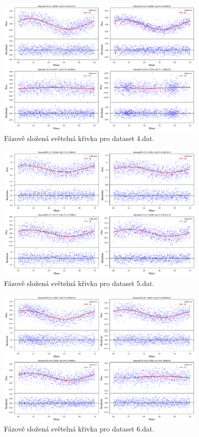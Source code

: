 \documentclass[a4paper,11pt,twocolumn]{article}
\begin{document}
    \begin{figure}
        \centering
        \includegraphics[width=0.9\textwidth]{phase/4_phase_folded.png}
        \caption{Fázově složená světelná křivka pro dataset 4.dat.}
        \label{fig:4_phase_folded}
    \end{figure}

    \begin{figure}
        \centering
        \includegraphics[width=0.9\textwidth]{phase/5_phase_folded.png}
        \caption{Fázově složená světelná křivka pro dataset 5.dat.}
        \label{fig:5_phase_folded}
    \end{figure}

    \begin{figure}
        \centering
        \includegraphics[width=0.9\textwidth]{phase/6_phase_folded.png}
        \caption{Fázově složená světelná křivka pro dataset 6.dat.}
        \label{fig:6_phase_folded}
    \end{figure}
\end{document}
